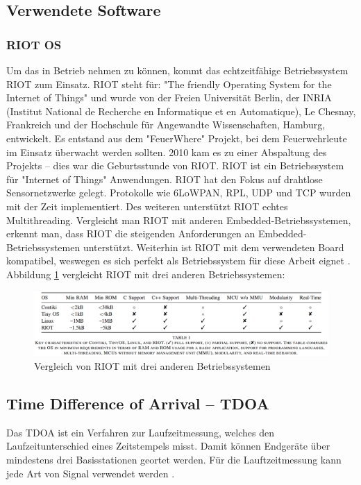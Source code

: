 \subsection{Verwendete Software}
\subsubsection{RIOT OS}
Um das \board \platz in Betrieb nehmen zu können, kommt das echtzeitfähige Betriebssystem RIOT zum Einsatz. RIOT steht für: "The friendly Operating System for the Internet of Things" und wurde von der Freien Universität Berlin, der INRIA (Institut National de Recherche en Informatique et en Automatique), Le Chesnay, Frankreich und der Hochschule für Angewandte Wissenschaften, Hamburg, entwickelt. Es entstand aus dem "FeuerWhere" Projekt, bei dem Feuerwehrleute im Einsatz überwacht werden sollten. 2010 kam es zu einer Abspaltung des Projekts -- dies war die Geburtsstunde von RIOT. RIOT ist ein Betriebssystem für "Internet of Things" Anwendungen. RIOT hat den Fokus auf drahtlose Sensornetzwerke gelegt. Protokolle wie 6LoWPAN, RPL, UDP und TCP wurden mit der Zeit implementiert. Des weiteren unterstützt RIOT echtes Multithreading. Vergleicht man RIOT mit anderen Embedded-Betriebssystemen, erkennt man, dass RIOT die steigenden Anforderungen an Embedded-Betriebssystemen unterstützt. Weiterhin ist RIOT mit dem verwendeten Board \board \platz kompatibel, weswegen es sich perfekt als Betriebssystem für diese Arbeit eignet \cite{src_RIOT}. Abbildung \ref{img:vergleich} vergleicht RIOT mit drei anderen Betriebssystemen:

\begin{figure}[H]
        \centering
		\hspace*{-1.5cm}
        \includegraphics[width=1.2\textwidth]{images/vergleich.png}
        \caption{Vergleich von RIOT mit drei anderen Betriebssystemen}
        \label{img:vergleich}
\end{figure}

\subsection{Time Difference of Arrival -- TDOA}
Das TDOA ist ein Verfahren zur Laufzeitmessung, welches den Laufzeitunterschied eines Zeitstempels misst. Damit können Endgeräte über mindestens drei Basisstationen geortet werden. Für die Lauftzeitmessung kann jede Art von Signal verwendet werden \cite{src_TDOA}.


